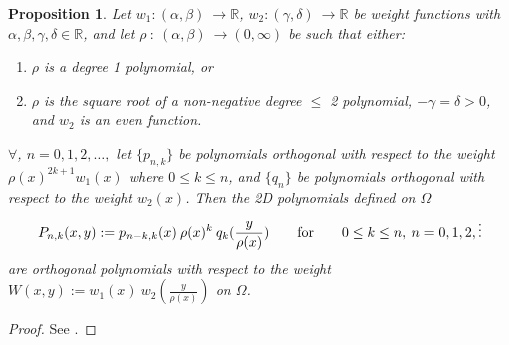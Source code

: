 \documentclass[11pt, oneside]{article}   	%
\newcommand{\R}{\mathbb{R}}
\newcommand{\Pnk}{P_{n,k}}
\newtheorem{proposition}{Proposition}
\begin{document}
\begin{proposition}
Let \(w_1 : (\alpha,\beta) \: \to \R\), \(w_2 : (\gamma,\delta) \: \to \R\) be weight functions with \(\alpha,\beta,\gamma,\delta \in \R\), and let \(\rho \: : \: (\alpha,\beta) \: \to (0,\infty)\) be such that either:
\begin{enumerate}
\item  \(\rho\) is a degree 1 polynomial, or 
\item \(\rho\) is the square root of a non-negative degree \(\le\) 2 polynomial, \(-\gamma = \delta > 0\), and \(w_2\) is an even function.
\end{enumerate}
$\forall$, $n = 0,1,2,\dots, $ let $\{p_{n,k}\}$ be polynomials orthogonal with respect to the weight $\rho(x)^{2k+1} w_1(x)$ where $0 \le k \le n$, and $\{q_{n}\}$ be polynomials orthogonal with respect to the weight $w_2(x)$. Then the 2D polynomials defined on $\Omega$
$$
\Pnk(x,y) := p_{n-k,k}(x) \: \rho(x)^k \: q_k(\frac{y}{\rho(x)}) \qquad\hbox{for} \qquad 0 \le k \le n, \: n = 0,1,2,\dots
$$
are orthogonal polynomials with respect to the weight \(W(x,y) := w_1(x) \: w_2(\frac{y}{\rho(x)}) \) on $\Omega$. 
\end{proposition}
\begin{proof}
See \cite[p55--56]{dunkl2014orthogonal}.
\end{proof}
\end{document}
